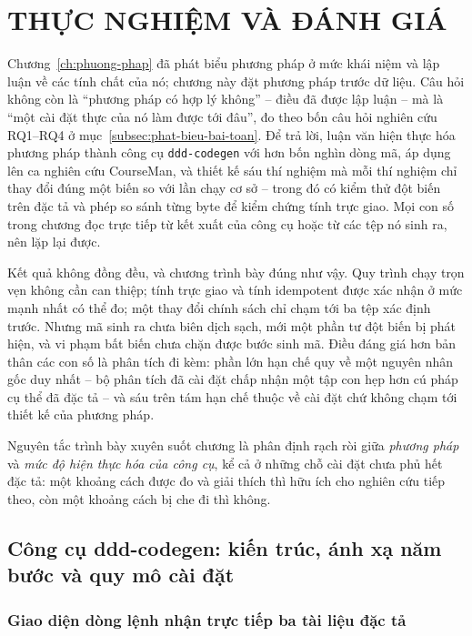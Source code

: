 \chapter{THỰC NGHIỆM VÀ ĐÁNH GIÁ}
\label{ch:thuc-nghiem}

Chương~\ref{ch:phuong-phap} đã phát biểu phương pháp ở mức khái niệm và lập luận về các tính chất của nó; chương này đặt phương pháp trước dữ liệu. Câu hỏi không còn là ``phương pháp có hợp lý không'' -- điều đã được lập luận -- mà là ``một cài đặt thực của nó làm được tới đâu'', đo theo bốn câu hỏi nghiên cứu RQ1--RQ4 ở mục~\ref{subsec:phat-bieu-bai-toan}. Để trả lời, luận văn hiện thực hóa phương pháp thành công cụ \texttt{ddd-codegen} với hơn bốn nghìn dòng mã, áp dụng lên ca nghiên cứu CourseMan, và thiết kế sáu thí nghiệm mà mỗi thí nghiệm chỉ thay đổi đúng một biến so với lần chạy cơ sở -- trong đó có kiểm thử đột biến trên đặc tả và phép so sánh từng byte để kiểm chứng tính trực giao. Mọi con số trong chương đọc trực tiếp từ kết xuất của công cụ hoặc từ các tệp nó sinh ra, nên lặp lại được.

Kết quả không đồng đều, và chương trình bày đúng như vậy. Quy trình chạy trọn vẹn không cần can thiệp; tính trực giao và tính idempotent được xác nhận ở mức mạnh nhất có thể đo; một thay đổi chính sách chỉ chạm tới ba tệp xác định trước. Nhưng mã sinh ra chưa biên dịch sạch, mới một phần tư đột biến bị phát hiện, và vi phạm bất biến chưa chặn được bước sinh mã. Điều đáng giá hơn bản thân các con số là phân tích đi kèm: phần lớn hạn chế quy về một nguyên nhân gốc duy nhất -- bộ phân tích đã cài đặt chấp nhận một tập con hẹp hơn cú pháp cụ thể đã đặc tả -- và sáu trên tám hạn chế thuộc về cài đặt chứ không chạm tới thiết kế của phương pháp.

Nguyên tắc trình bày xuyên suốt chương là phân định rạch ròi giữa \emph{phương pháp} và \emph{mức độ hiện thực hóa của công cụ}, kể cả ở những chỗ cài đặt chưa phủ hết đặc tả: một khoảng cách được đo và giải thích thì hữu ích cho nghiên cứu tiếp theo, còn một khoảng cách bị che đi thì không.

\section{Công cụ ddd-codegen: kiến trúc, ánh xạ năm bước và quy mô cài đặt}
\label{sec:cong-cu}

\subsection{Giao diện dòng lệnh nhận trực tiếp ba tài liệu đặc tả}

